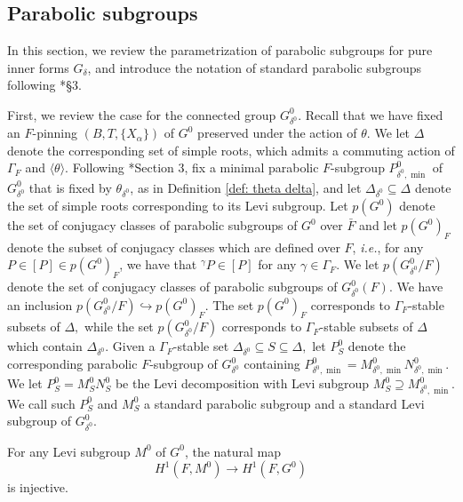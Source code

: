 \documentclass[11pt,letterpaper]{amsart}
\numberwithin{equation}{section}
\begin{document}
\subsection{Parabolic subgroups}\label{subsection: parabolic subgroups}

In this section, we review the parametrization of parabolic subgroups for pure inner forms $G_\delta$, and introduce the notation of standard parabolic subgroups following \cite{BJ01}*{\S 3}. 


First, we review the case for the connected group $G_{\delta^0}^0$.
Recall that we have fixed an $F$-pinning $(B,T,\{X_{\alpha}\})$ of $G^0$ preserved under the action of $\theta$. We let $\Delta$ denote the corresponding set of simple roots, which admits a commuting action of $\Gamma_F$ and $\langle \theta \rangle$.
Following \cite{Bor79}*{Section 3}, fix a minimal parabolic $F$-subgroup $P_{\delta^0,\min}^0$ of $G^0_{\delta^0}$ that is fixed by $\theta_{\delta^0}$, as in Definition \ref{def: theta delta}, and let $\Delta_{\delta^0} \subseteq\Delta$ denote the set of simple roots corresponding to its Levi subgroup.
Let $p(G^0)$ denote the set of conjugacy classes of parabolic subgroups of $G^0$ over ${\bar F}$ and let $p(G^0)_F$ denote the subset of conjugacy classes which are defined over $F$, {\it i.e.}, for any  $P\in[P]\in p(G^0)_F$, we have that ${}^\gamma P\in [P]$ for any $\gamma\in\Gamma_F$. 
We let $p(G^0_{\delta^0}/F)$ denote the set of conjugacy classes of parabolic subgroups of $G^0_{\delta^0}(F)$. 
We have an inclusion $p(G^0_{\delta^0}/F)\hookrightarrow p(G^0)_F$. 
The set $p(G^0)_F$ corresponds to $\Gamma_F$-stable subsets of $\Delta,$ while the set $p(G^0_{\delta^0}/F)$ corresponds to $\Gamma_F$-stable subsets of $\Delta$ which contain $\Delta_{\delta^0}$.
Given a $\Gamma_F$-stable set $\Delta_{\delta^0}\subseteq {S}\subseteq\Delta,$ let $P_{S}^0$ denote the corresponding parabolic $F$-subgroup of $G^0_{\delta^0}$ containing $P_{\delta^0,\min}^0= M_{\delta^0,\min}^0 N_{\delta^0,\min}^0$.  We let $P_{S}^0=M_{S}^0 N_{S}^0$ be the Levi decomposition with Levi subgroup $M_{S}^0 \supseteq M_{\delta^0,\min}^0$. We call such $P_{S}^0$ and $M_S^0$ a standard parabolic subgroup and a standard Levi subgroup of $G^0_{\delta^0}$.

\begin{lemma}
\label{lemma: injection of pure inner forms of Levi}
For any Levi subgroup $M^0$ of $G^0$, the natural map
\[
H^{1}(F, M^0) \rightarrow H^{1}(F, G^0)
\]
is injective.
\end{lemma}
\end{document}

